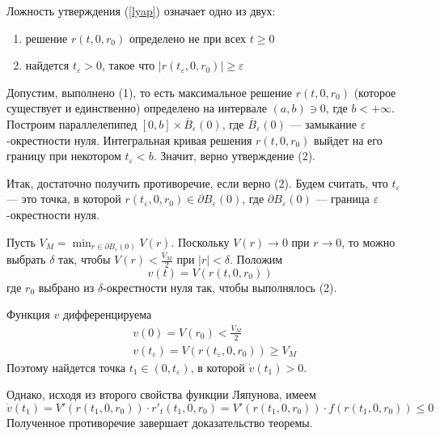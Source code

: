 \documentclass{article}
\begin{document}
Ложность утверждения (\ref{lyap}) означает одно из двух:
\begin{enumerate}
    \item решение $r(t, 0, r_0)$ определено не при всех $t \ge 0$
    \item найдется $t_{\varepsilon} > 0$, такое что $|r(t_{\varepsilon}, 0, r_0)| \ge \varepsilon$
\end{enumerate}

Допустим, выполнено (1), то есть максимальное решение $r(t, 0, r_0)$ (которое существует и единственно) определено на интервале $(a,b) \ni 0$, где $b < +\infty$. Построим параллелепипед $[0,b] \times \overline{B}_{\varepsilon}(0)$, где $\overline{B}_{\varepsilon}(0)$ --- замыкание $\varepsilon$-окрестности нуля. Интегральная кривая решения $r(t, 0, r_0)$ выйдет на его границу при некотором $t_{\varepsilon} < b$. Значит, верно утверждение (2).

Итак, достаточно получить противоречие, если верно (2). Будем считать, что $t_{\varepsilon}$ --- это точка, в которой $r(t_{\varepsilon}, 0, r_0) \in \partial B_{\varepsilon}(0)$, где $\partial B_{\varepsilon}(0)$ --- граница $\varepsilon$-окрестности нуля.

Пусть $V_M = \displaystyle\min_{r \in \partial B_{\varepsilon}(0)}V(r)$. Поскольку $V(r) \to 0$ при $r \to 0$, то можно выбрать $\delta$ так, чтобы $V(r) < \frac{V_M}{2}$ при $|r| < \delta$. Положим
\begin{equation*}
    v(t) = V(r(t, 0, r_0))
\end{equation*}
где $r_0$ выбрано из $\delta$-окрестности нуля так, чтобы выполнялось (2).

Функция $v$ дифференцируема
\begin{equation*}
    \begin{aligned}
        &v(0) = V(r_0) < \frac{V_M}{2}\\
        &v(t_{\varepsilon}) = V(r(t_{\varepsilon}, 0, r_0)) \ge V_M
    \end{aligned}
\end{equation*}
Поэтому найдется точка $t_1 \in (0, t_{\varepsilon})$, в которой $\dot{v}(t_1) > 0$.

Однако, исходя из второго свойства функции Ляпунова, имеем
\begin{equation*}
    \dot{v}(t_1) = V'(r(t_1, 0, r_0))\cdot r'_t(t_1, 0, r_0) = V'(r(t_1, 0, r_0)) \cdot f(r(t_1, 0, r_0)) \le 0
\end{equation*}
Полученное противоречие завершает доказательство теоремы.\\
\end{document}
